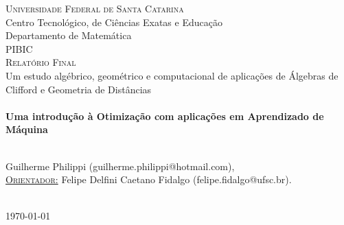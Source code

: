 \documentclass[a4paper,12pt]{report}
\theoremstyle{plain}
\theoremstyle{definition}
\begin{document}
\begin{titlepage}
		\textsc{\LARGE \hspace{-0.17cm}Universidade Federal de Santa Catarina}\\[0.5cm] %
		{\Large Centro Tecnológico, de Ciências Exatas e Educação\\ Departamento de Matemática}\\[1.5cm] %
		\textsc{\Large PIBIC \\ Relatório Final \vspace{1.5cm}  \\ }{\large Um estudo algébrico, geométrico e computacional de aplicações de Álgebras de Clifford e Geometria de Distâncias}\\[2.0cm] %
		
		
		
		\HRule \\[0.4cm]
		{ \LARGE \bfseries \textbf{Uma introdução à Otimização com aplicações em Aprendizado de Máquina}} \\ [0.4cm] %
		\HRule \\[2cm]
		
		
		\begin{minipage}{1\textwidth}
			\begin{center} \large
				Guilherme Philippi (guilherme.philippi@hotmail.com),
				\vspace{0.5cm}
				\\
				\underline{\textsc{Orientador:}} \vspace{0.2cm}
				Felipe Delfini Caetano Fidalgo (felipe.fidalgo@ufsc.br).
			\end{center}
		\end{minipage} \\[2cm]
		
		
		{\large \today} %
		
		
		\vfill %
		
	\end{titlepage}
	
\end{document}
